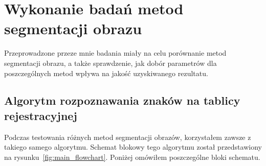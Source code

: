 \section{Wykonanie badań metod segmentacji obrazu}
Przeprowadzone przeze mnie badania miały na celu porównanie metod segmentacji obrazu, a także sprawdzenie, jak dobór parametrów dla poszczególnych metod wpływa na jakość uzyskiwanego rezultatu.

\subsection{Algorytm rozpoznawania znaków na tablicy rejestracyjnej}
Podczas testowania różnych metod segmentacji obrazów, korzystałem zawsze z takiego samego algorytmu. Schemat blokowy tego algorytmu został przedstawiony na rysunku~\ref{fig:main_flowchart}. Poniżej omówiłem poszczególne bloki schematu.
